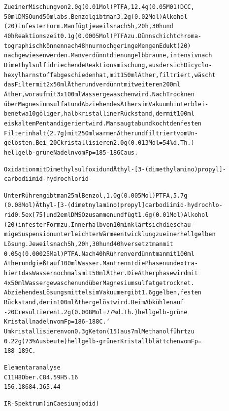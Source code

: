 \documentclass[a4paper,11pt]{article}
\begin{document}
\begin{alltt}
Zu einer Mischung von 2.0 g (0.01 Mol) PTFA, 12.4 g (0.05 M01) DCC,
50 ml DMSO und 50 ml abs. Benzol gibt man 3.2 g (0.02 Mol) Alkohol
(20) in fester Form. Man fügt jeweils nach 5 h, 20 h, 30 h und
40 h Reaktionszeit 0.1 g (0.0005 Mol) PTFA zu. Dünnschichtchroma-
tographisch können nach 48 h nur noch geringe Mengen Edukt (20)
nachgewiesen werden. Man verdünnt die nun gelbbraune, intensiv nach
Dimethylsulfid riechende Reaktionsmischung, aus der sich Dicyclo-
hexylharnstoff abgeschieden hat, mit 150 ml Äther, filtriert, wäscht
das Filter mit 2 x 50 ml Äther und verdünnt mit weiteren 200 ml
Äther, worauf mit 3 x 100 ml Wasser gewaschen wird. Nach Trocknen
über Magnesiumsulfat und Abziehen des Äthers im Vakuum hinterblei-
ben etwa 10 g öliger, halbkristalliner Rückstand, der mit 100 ml
eiskaltem Pentan digeriert wird. Man saugt ab und kocht den festen
Filterinhalt (2.7 g) mit 250 ml warmen Äther und filtriert vom Un-
gelösten. Bei -20\degree{}C kristallisieren 2.0 g (0.013 Mol = 54 \% d.Th.)
hellgelb-grüne Nadeln vom Fp = 185 - 186\degree{}C aus.

\newpage
{}


Oxidation mit Dimethylsulfoxid und Äthyl-[3-(dimethylamino)propyl]-
carbodiimid-hydrochlorid

Unter Rühren gibt man 25 ml Benzol, 1.0 g (0.005 Mol) PTFA, 5.7 g
(0.08 Mol) Äthyl-[3-(dimetnylamino)propyl]carbodiimid-hydrochlo-
rid \raise0.5ex\hbox{[75]} und 2e ml DMSO zusammen und fügt 1.6 g (0.01 Mol) Alkohol
(20) in fester Form zu. Innerhalb von 10 min klärt sich die schau-
mige Suspension unter leichter Wärmeentwicklung zu einer hellgelben
Lösung. Jeweils nach 5 h, 20 h, 30 h und 40 h versetzt man mit
0.05 g (0.00025 Mal) PTFA. Nach 40 h Rühren verdünnt man mit 100 ml
Äther und gießt auf 100 ml Wasser. Man trennt die Phasen und extra-
hiert das Wasser nochmals mit 50 ml Äther. Die Ätherphase wird mit
4 x 50 ml Wasser gewaschen und über Magnesiumsulfat getrocknet.
Abziehen des Lösungsmittels im Vakuum ergibt 1.6 g gelben, festen
Rückstand, der in 100 ml Äther gelöst wird. Beim Abkühlen auf
-20\degree{}C resultieren 1.2 g (0.008 Mol = 77 \% d.Th.) hellgelb-grüne
Kristallnadeln vom Fp = 186 - 188\degree{}C. '
Umkristallisieren von 0.3 g Keton (15) aus 7 ml Methanol führt zu
0.22 g (73 \% Ausbeute) hellgelb-grüner Kristallblättchen vom Fp =
188 - 189\degree{}C.

Elementaranalyse
C11H8O        ber. C  84.59   H  5.16
156.186               84.36      5.44

IR-Spektrum (in Caesiumjodid)
\end{alltt}
\end{document}
